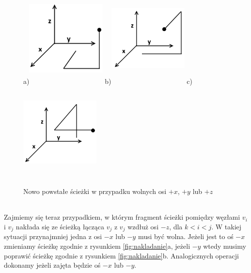 \documentclass[brudnopis]{xmgr}
\begin{document}
\begin{figure}[ht!]
  \centering
  a)\includegraphics[width=4cm,height=5cm]{rysunki/wolne_x.png}
  b)\includegraphics[width=4cm,height=5cm]{rysunki/wolne_y.png}
  c)\includegraphics[width=4cm,height=5cm]{rysunki/wolne_z.png}
  \caption{Nowo powstałe ścieżki w przypadku wolnych osi $+x$, $+y$ lub $+z$}
  \label{fig:nowe sciezki}
\end{figure} 
\\\indent Zajmiemy się teraz przypadkiem, w którym fragment ścieżki pomiędzy węzłami $v_i$ i $v_j$ nakłada się ze ścieżką łącząca $v_j$ z $v_j$ wzdłuż osi $-z$, dla $k < i < j$. W takiej sytuacji przynajmniej jedna z osi $-x$ lub $-y$ musi być wolna. Jeżeli jest to oś $-x$ zmieniamy ścieżkę zgodnie z rysunkiem \ref{fig:nakladanie}a, jeżeli $-y$ wtedy musimy poprawić ścieżkę zgodnie z rysunkiem \ref{fig:nakladanie}b. Analogicznych operacji dokonamy jeżeli zajęta będzie oś $-x$ lub $-y$.
\end{document}

